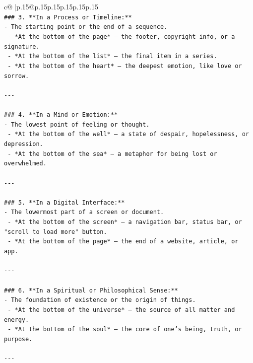 \documentclass{article}
\begin{document}
{\begin{supertabular}{c@{$\;$}|p{.15\linewidth}@{}p{.15\linewidth}p{.15\linewidth}p{.15\linewidth}p{.15\linewidth}p{.15\linewidth}}
{{{\\ 
\texttt{\#\#\# 3. **In a Process or Timeline:**} \\
\texttt{{-} The starting point or the end of a sequence.} \\
\texttt{  {-} *At the bottom of the page* — the footer, copyright info, or a signature.} \\
\texttt{  {-} *At the bottom of the list* — the final item in a series.} \\
\texttt{  {-} *At the bottom of the heart* — the deepest emotion, like love or sorrow.} \\
\\ 
\texttt{{-}{-}{-}} \\
\\ 
\texttt{\#\#\# 4. **In a Mind or Emotion:**} \\
\texttt{{-} The lowest point of feeling or thought.} \\
\texttt{  {-} *At the bottom of the well* — a state of despair, hopelessness, or depression.} \\
\texttt{  {-} *At the bottom of the sea* — a metaphor for being lost or overwhelmed.} \\
\\ 
\texttt{{-}{-}{-}} \\
\\ 
\texttt{\#\#\# 5. **In a Digital Interface:**} \\
\texttt{{-} The lowermost part of a screen or document.} \\
\texttt{  {-} *At the bottom of the screen* — a navigation bar, status bar, or "scroll to load more" button.} \\
\texttt{  {-} *At the bottom of the page* — the end of a website, article, or app.} \\
\\ 
\texttt{{-}{-}{-}} \\
\\ 
\texttt{\#\#\# 6. **In a Spiritual or Philosophical Sense:**} \\
\texttt{{-} The foundation of existence or the origin of things.} \\
\texttt{  {-} *At the bottom of the universe* — the source of all matter and energy.} \\
\texttt{  {-} *At the bottom of the soul* — the core of one’s being, truth, or purpose.} \\
\\ 
\texttt{{-}{-}{-}} \\
\\ 
}}}
\end{supertabular}}
\end{document}
